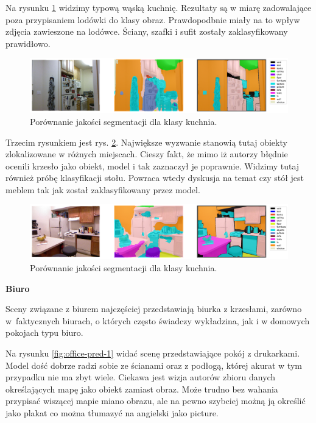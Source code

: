 Na rysunku \ref{fig:kitchen-pred-2} widzimy typową wąską kuchnię. Rezultaty są w miarę zadowalające poza przypisaniem lodówki do klasy obraz. Prawdopodbnie miały na to wpływ zdjęcia zawieszone na lodówce. Ściany, szafki i sufit zostały zaklasyfikowany prawidłowo.

\begin{figure}[ht!]
    \centering
    \includegraphics[width=\textwidth]{img/preds_analysis/gt_vs_pred/kitchen-2.png}
    \caption{Porównanie jakości segmentacji dla klasy kuchnia.}
    \label{fig:kitchen-pred-2}
\end{figure}

Trzecim rysunkiem jest rys. \ref{fig:kitchen-pred-3}. Największe wyzwanie stanowią tutaj obiekty zlokalizowane w różnych miejscach. Cieszy fakt, że mimo iż autorzy błędnie ocenili krzesło jako obiekt, model i tak zaznaczył je poprawnie. Widzimy tutaj również próbę klasyfikacji stołu. Powraca wtedy dyskusja na temat czy stół jest meblem tak jak został zaklasyfikowany przez model.

\begin{figure}[ht!]
    \centering
    \includegraphics[width=\textwidth]{img/preds_analysis/gt_vs_pred/kitchen-3.png}
    \caption{Porównanie jakości segmentacji dla klasy kuchnia.}
    \label{fig:kitchen-pred-3}
\end{figure}

\noindent
\textbf{Biuro}

Sceny związane z biurem najczęściej przedstawiają biurka z krzesłami, zarówno w~faktycznych biurach, o których często świadczy wykładzina, jak i w domowych pokojach typu biuro.

Na rysunku \ref{fig:office-pred-1} widać scenę przedstawiające pokój z drukarkami. Model dość dobrze radzi sobie ze ścianami oraz z podłogą, której akurat w tym przypadku nie ma zbyt wiele. Ciekawa jest wizja autorów zbioru danych określających mapę jako obiekt zamiast obraz. Może trudno bez wahania przypisać wiszącej mapie miano obrazu, ale na pewno szybciej możną ją określić jako plakat co można tłumazyć na angielski jako picture.

